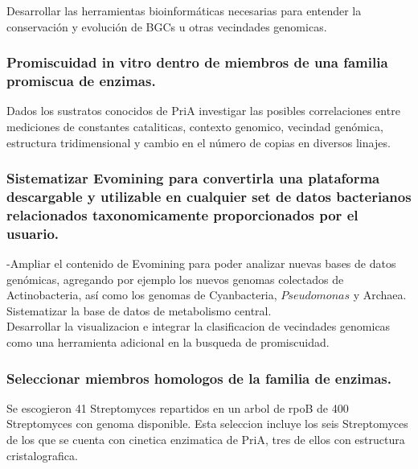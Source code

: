 \documentclass[12pt,twoside]{reedthesis}
\begin{document}
  Desarrollar las herramientas bioinformáticas necesarias para entender la
  conservación y evolución de BGCs u otras vecindades genomicas.
  
  \subsubsection{Promiscuidad in vitro dentro de miembros de una familia
  promiscua de
  enzimas.}\label{promiscuidad-in-vitro-dentro-de-miembros-de-una-familia-promiscua-de-enzimas.}
  
  Dados los sustratos conocidos de PriA investigar las posibles
  correlaciones entre mediciones de constantes cataliticas, contexto
  genomico, vecindad genómica, estructura tridimensional y cambio en el
  número de copias en diversos linajes.
  
  \subsubsection{Sistematizar Evomining para convertirla una plataforma
  descargable y utilizable en cualquier set de datos bacterianos
  relacionados taxonomicamente proporcionados por el
  usuario.}\label{sistematizar-evomining-para-convertirla-una-plataforma-descargable-y-utilizable-en-cualquier-set-de-datos-bacterianos-relacionados-taxonomicamente-proporcionados-por-el-usuario.}
  
  -Ampliar el contenido de Evomining para poder analizar nuevas bases de
  datos genómicas, agregando por ejemplo los nuevos genomas colectados de
  Actinobacteria, así como los genomas de Cyanbacteria, \(Pseudomonas\) y
  Archaea.\\
  Sistematizar la base de datos de metabolismo central.\\
  Desarrollar la visualizacion e integrar la clasificacion de vecindades
  genomicas como una herramienta adicional en la busqueda de promiscuidad.
  
  \subsubsection{Seleccionar miembros homologos de la familia de
  enzimas.}\label{seleccionar-miembros-homologos-de-la-familia-de-enzimas.}
  
  Se escogieron 41 Streptomyces repartidos en un arbol de rpoB de 400
  Streptomyces con genoma disponible. Esta seleccion incluye los seis
  Streptomyces de los que se cuenta con cinetica enzimatica de PriA, tres
  de ellos con estructura cristalografica.
  
\end{document}
